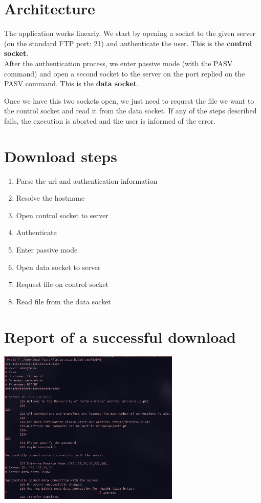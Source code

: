 \documentclass[11pt]{report}
\begin{document}
\section{Architecture}

The application works linearly. We start by opening a socket to the given
server (on the standard FTP port: 21) and authenticate the user. This is
the \textbf{control socket}.\\
After the authentication process, we enter passive mode (with the PASV
command) and open a second socket to the server on the port replied on
the PASV command. This is the \textbf{data socket}.

Once we have this two sockets open, we just need to request the file
we want to the control socket and read it from the data socket. If any
of the steps described fails, the execution is aborted and the user is
informed of the error.

\section{Download steps}
\begin{enumerate}
\item Parse the url and authentication information
\item Resolve the hostname
\item Open control socket to server
\item Authenticate
\item Enter passive mode
\item Open data socket to server
\item Request file on control socket
\item Read file from the data socket
\end{enumerate}

\section{Report of a successful download}

\includegraphics[width=0.65\textwidth]{images/download_report.png}
\end{document}
